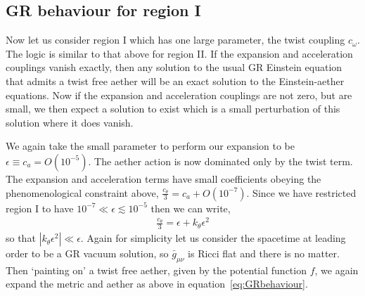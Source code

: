 \documentclass[12pt]{article}
\numberwithin{equation}{section}
\begin{document}
\subsection{GR behaviour for region I}
\label{sec:paintingI}

Now let us consider region I which has one large parameter, the twist coupling $c_\omega$. 
The logic is similar to that above for region II. If the expansion and acceleration couplings vanish exactly, then any solution to the usual GR Einstein equation that admits a twist free aether will be an exact solution to the Einstein-aether equations. Now if the expansion and acceleration couplings
are not zero, but are small, we then expect a solution to exist which is a small perturbation of this solution where it does vanish.  

We again take the small parameter to perform our expansion to be $\epsilon \equiv c_a = O(10^{-5})$. 
The aether action is now dominated only by the twist term. The expansion and acceleration terms have small coefficients obeying the phenomenological constraint above, $\frac{c_\theta}{3} = c_a  + O(10^{-7})$. 
Since we have restricted region I to have $10^{-7} \ll \epsilon \lesssim 10^{-5}$ then we can write,
\begin{eqnarray}
\frac{c_\theta}{3} = \epsilon + k_\theta \epsilon^2
\end{eqnarray}
so that $| k_\theta \epsilon^2 | \ll \epsilon$.
Again for simplicity let us consider the spacetime at leading order to be a GR vacuum solution, so $\bar{g}_{\mu\nu}$ is Ricci flat and there is no matter.
Then `painting on' a twist free aether, given by the potential function $f$, we again expand the metric and aether as above in equation~\eqref{eq:GRbehaviour}.
\end{document}
